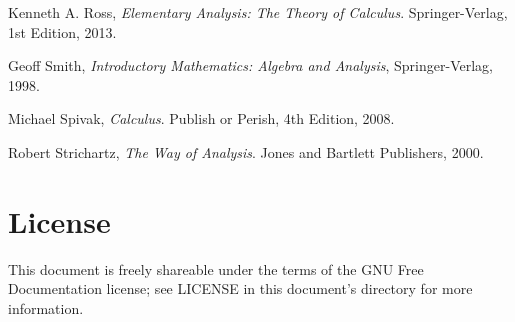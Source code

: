 \documentclass{article}
\theoremstyle{definition}
\begin{document}
\begin{thebibliography}{9}

  Kenneth A. Ross,
  \emph{Elementary Analysis: The Theory of Calculus}.
  Springer-Verlag,
  1st Edition,
  2013.

  Geoff Smith,
  \emph{Introductory Mathematics: Algebra and Analysis},
  Springer-Verlag,
  1998.

  Michael Spivak,
  \emph{Calculus}.
  Publish or Perish,
  4th Edition,
  2008.

  Robert Strichartz,
  \emph{The Way of Analysis}.
  Jones and Bartlett Publishers,
  2000.
  
\end{thebibliography}

\section{License}

This document is freely shareable under the terms of the GNU Free Documentation
license; see LICENSE in this document's directory for more information.
\end{document}

